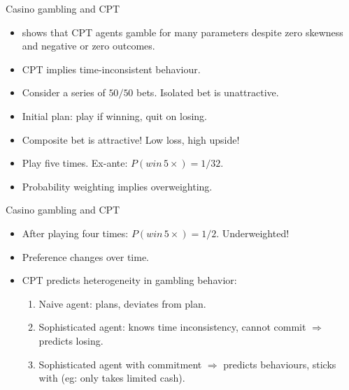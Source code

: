 \documentclass[11pt, aspectratio=169]{beamer}
\begin{document}
\begin{frame}{Casino gambling and CPT}
    \begin{itemize}
        \item \citet{Barberis2012a} shows that CPT agents gamble for many parameters despite zero skewness and negative or zero outcomes.\medskip
        \item CPT implies time-inconsistent behaviour.\medskip
        \item Consider a series of $50/50$ bets. Isolated bet is unattractive.\medskip
        \item Initial plan: play if winning, quit on losing.\medskip
        \item Composite bet is attractive! Low loss, high upside!\medskip
        \item Play five times. Ex-ante: $P(win\, 5 \times) = 1/32$.\medskip
        \item Probability weighting implies overweighting.\medskip
    \end{itemize}
\end{frame}

\begin{frame}{Casino gambling and CPT}
    \begin{itemize}
        \item After playing four times: $P(win\, 5 \times) = 1/2$. Underweighted!\bigskip
        \item Preference changes over time.\bigskip
        \item CPT predicts heterogeneity in gambling behavior:\bigskip
        \begin{enumerate}
            \item Naive agent: plans, deviates from plan.\medskip
            \item Sophisticated agent: knows time inconsistency, cannot commit
            $\Rightarrow$ predicts losing.\medskip
            \item Sophisticated agent with commitment $\Rightarrow$ predicts behaviours, sticks with (eg: only takes limited cash).\medskip
        \end{enumerate}
    \end{itemize}
\end{frame}
\end{document}

